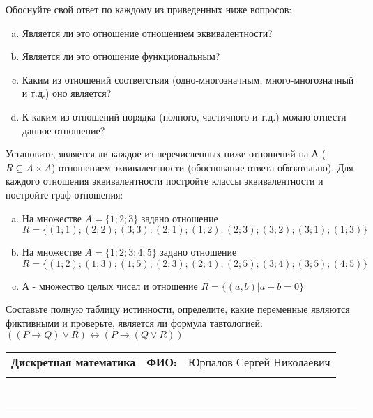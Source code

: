 \documentclass[10pt]{exam}
\newcommand{\class}{Дискретная математика}
\newcommand{\examdate}{}
\begin{document}
\begin{questions}
Обоснуйте свой ответ по каждому из приведенных ниже вопросов:
\begin{enumerate} [a)]\setcounter{enumi}{0}
    \item Является ли это отношение отношением эквивалентности?
    \item Является ли это отношение функциональным?
    \item Каким из отношений соответствия (одно-многозначным, много-многозначный и т.д.) оно является?
    \item К каким из отношений порядка (полного, частичного и т.д.) можно отнести данное отношение?
\end{enumerate}
\question
Установите, является ли каждое из перечисленных ниже отношений на А ($R \subseteq A \times A$) отношением эквивалентности (обоснование ответа обязательно). Для каждого отношения эквивалентности постройте классы 
эквивалентности и постройте граф отношения:
\begin{enumerate} [a)]\setcounter{enumi}{0}
\item На множестве $A = \{1; 2; 3\}$ задано отношение $R = \{(1; 1); (2; 2); (3; 3); (2; 1); (1; 2); (2; 3); (3; 2); (3; 1); (1; 3)\}$
\item На множестве $A = \{1; 2; 3; 4; 5\}$ задано отношение $R = \{(1; 2); (1; 3); (1; 5); (2; 3); (2; 4); (2; 5); (3; 4); (3; 5); (4; 5)\}$
\item А - множество целых чисел и отношение $R = \{(a,b)|a + b = 0\}$
\end{enumerate}\question Составьте полную таблицу истинности, определите, какие переменные являются фиктивными и проверьте, является ли формула тавтологией:
$((P \rightarrow Q) \lor R) \leftrightarrow (P \rightarrow (Q \lor R))$

\end{questions}
\newpage
\begin{flushright}
\begin{tabular}{p{2.8in} r l}
\textbf{\class} & \textbf{ФИО:} &Юрпалов Сергей Николаевич
\\

\textbf{\examdate} &&\\
\end{tabular}\\
\end{flushright}
\rule[1ex]{\textwidth}{.1pt}
\end{document}
